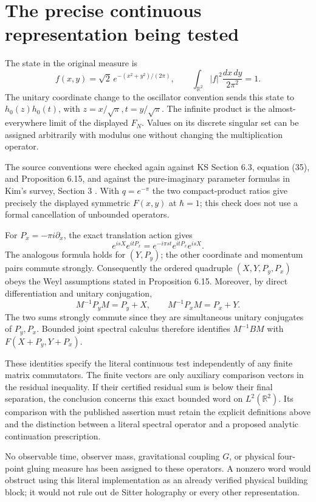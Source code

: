\documentclass[11pt,a4paper]{article}
\newcommand{\R}{\mathbb R}
\begin{document}
\newpage
\section{The precise continuous representation being tested}
The state in the original measure is
\[
 f(x,y)=\sqrt{2}\,e^{-(x^2+y^2)/(2\pi)},\qquad
 \int_{\R^2}|f|^2\frac{dx\,dy}{2\pi^2}=1.
\]
The unitary coordinate change to the oscillator convention sends
this state to $h_0(z)h_0(t)$, with $z=x/\sqrt\pi,t=y/\sqrt\pi$.
The infinite product is the almost-everywhere limit of the displayed
$F_N$. Values on its discrete singular set can be assigned arbitrarily
with modulus one without changing the multiplication operator.

The source conventions were checked again against KS Section 6.3,
equation (35), and Proposition 6.15, and against the pure-imaginary
parameter formulas in Kim's survey, Section 3 \cite{trilogy}.
With $q=e^{-\pi}$ the two compact-product ratios give precisely the
displayed symmetric $F(x,y)$ at $\hbar=1$; this check does not use a
formal cancellation of unbounded operators.

For $P_x=-\pi i\partial_x$, the exact translation action gives
\[
 e^{isX}e^{itP_x}=e^{-i\pi st}e^{itP_x}e^{isX}.
\]
The analogous formula holds for $(Y,P_y)$; the other coordinate and
momentum pairs commute strongly. Consequently the ordered quadruple
$(X,Y,P_y,P_x)$ obeys the Weyl assumptions stated in Proposition 6.15.
Moreover, by direct differentiation and unitary conjugation,
\[
 M^{-1}P_yM=P_y+X,\qquad M^{-1}P_xM=P_x+Y.
\]
The two sums strongly commute since they are simultaneous unitary
conjugates of $P_y,P_x$. Bounded joint spectral calculus therefore
identifies $M^{-1}BM$ with $F(X+P_y,Y+P_x)$.

These identities specify the literal continuous test independently
of any finite matrix commutators. The finite vectors are only
auxiliary comparison vectors in the residual inequality.
If their certified residual sum is below their final separation,
the conclusion concerns this exact bounded word on $L^2(\R^2)$.
Its comparison with the published assertion must retain the explicit
definitions above and the distinction between a literal spectral
operator and a proposed analytic continuation prescription.

No observable time, observer mass, gravitational coupling $G$, or
physical four-point gluing measure has been assigned to these
operators. A nonzero word would obstruct using this literal
implementation as an already verified physical building block; it
would not rule out de Sitter holography or every other representation.
\end{document}
